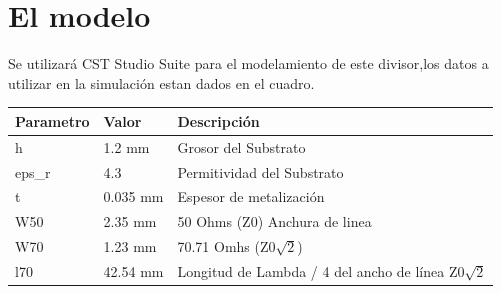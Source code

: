 \documentclass[a4paper]{IEEEtran} %
\begin{document}
\newline
\newline
\newline
\newline
\newline
\section{El modelo}
Se utilizará CST Studio Suite para el modelamiento de este divisor,los datos a utilizar en la simulación estan dados en el cuadro.
\begin{table}[h]
\begin{tabular}{@{}lll@{}}
\toprule
Parametro & Valor    & Descripción                               \\ \midrule
h         & 1.2 mm   & Grosor del Substrato                      \\
eps\_r    & 4.3      & Permitividad del Substrato                \\
t         & 0.035 mm & Espesor de metalización                   \\ \midrule
W50       & 2.35 mm  & 50 Ohms (Z0) Anchura de linea               \\
W70       & 1.23 mm  & 70.71 Omhs (Z0$\sqrt{2}$)                          \\
l70       & 42.54 mm & Longitud de Lambda / 4 del ancho de línea Z0$\sqrt{2}$\\ \bottomrule
\end{tabular}
\end{table}



\end{document}
